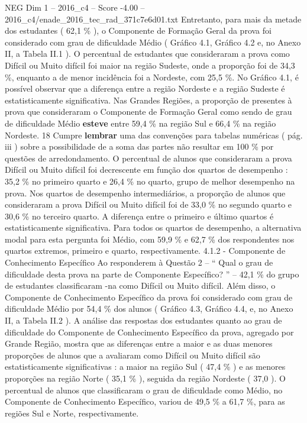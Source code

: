 \begin{textsample}{NEG Dim 1 – 2016\_c4 – Score -4.00 – 2016\_c4/enade\_2016\_tec\_rad\_371c7e6d01.txt}
Entretanto, para mais da metade dos estudantes ( 62,1 \% ), o Componente de Formação Geral da prova foi considerado com grau de dificuldade Médio ( Gráfico 4.1, Gráfico 4.2 e, no Anexo II, a Tabela II.1 ).
O percentual de estudantes que consideraram a prova como Difícil ou Muito difícil foi maior na região Sudeste, onde a proporção foi de 34,3 \%, enquanto a de menor incidência foi a Nordeste, com 25,5 \%.
No Gráfico 4.1, é possível observar que a diferença entre a região Nordeste e a região Sudeste é estatisticamente significativa.
Nas Grandes Regiões, a proporção de presentes à prova que consideraram o Componente de Formação Geral como sendo de grau de dificuldade Médio \textbf{esteve} entre 59,4 \% na região Sul e 66,4 \% na região Nordeste. 18 Cumpre \textbf{lembrar} uma das convenções para tabelas numéricas ( pág. iii ) sobre a possibilidade de a soma das partes não resultar em 100 \% por questões de arredondamento.
O percentual de alunos que consideraram a prova Difícil ou Muito difícil foi decrescente em função dos quartos de desempenho : 35,2 \% no primeiro quarto e 26,4 \% no quarto, grupo de melhor desempenho na prova.
Nos quartos de desempenho intermediários, a proporção de alunos que consideraram a prova Difícil ou Muito difícil foi de 33,0 \% no segundo quarto e 30,6 \% no terceiro quarto.
A diferença entre o primeiro e último quartos é estatisticamente significativa.
Para todos os quartos de desempenho, a alternativa modal para esta pergunta foi Médio, com 59,9 \% e 62,7 \% dos respondentes nos quartos extremos, primeiro e quarto, respectivamente. 4.1.2 - Componente de Conhecimento Específico Ao responderem à Questão 2 – “ Qual o grau de dificuldade desta prova na parte de Componente Específico? ” – 42,1 \% do grupo de estudantes classificaram -na como Difícil ou Muito difícil.
Além disso, o Componente de Conhecimento Específico da prova foi considerado com grau de dificuldade Médio por 54,4 \% dos alunos ( Gráfico 4.3, Gráfico 4.4, e, no Anexo II, a Tabela II.2 ).
A análise das respostas dos estudantes quanto ao grau de dificuldade do Componente de Conhecimento Específico da prova, agregado por Grande Região, mostra que as diferenças entre a maior e as duas menores proporções de alunos que a avaliaram como Difícil ou Muito difícil são estatisticamente significativas : a maior na região Sul ( 47,4 \% ) e as menores proporções na região Norte ( 35,1 \% ), seguida da região Nordeste ( 37,0 ).
O percentual de alunos que classificaram o grau de dificuldade como Médio, no Componente de Conhecimento Específico, variou de 49,5 \% a 61,7 \%, para as regiões Sul e Norte, respectivamente.

\end{textsample}
